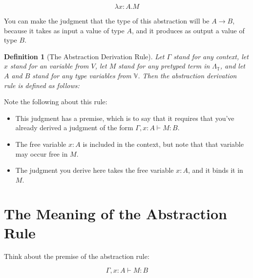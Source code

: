 \documentclass{book}
\numberwithin{equation}{chapter}
\newtheorem{definition}{Definition}
\begin{document}
\begin{equation}
\lambda x : A.M
\end{equation}

\noindent
You can make the judgment that the type of this abstraction will be $A \rightarrow B$, because it takes as input a value of type $A$, and it produces as output a value of type $B$.

\begin{definition}[The Abstraction Derivation Rule]
Let $\Gamma$ stand for any context, let $x$ stand for an variable from $V$, let $M$ stand for any pretyped term in $\Lambda_{\mathbb{T}}$, and let $A$ and $B$ stand for any type variables from $\mathbb{V}$. Then the abstraction derivation rule is defined as follows: 

\begin{prooftree}
\end{prooftree}

\end{definition}

\noindent
Note the following about this rule:

\begin{itemize}

\item{This judgment has a premise, which is to say that it requires that you've already derived a judgment of the form $\Gamma, x : A \vdash M : B$.}

\item{The free variable $x : A$ is included in the context, but note that that variable may occur free in $M$.}

\item{The judgment you derive here takes the free variable $x : A$, and it binds it in $M$.}

\end{itemize}


\section{The Meaning of the Abstraction Rule}

Think about the premise of the abstraction rule:

\begin{equation}
\Gamma, x : A \vdash M : B
\end{equation}
\end{document}
